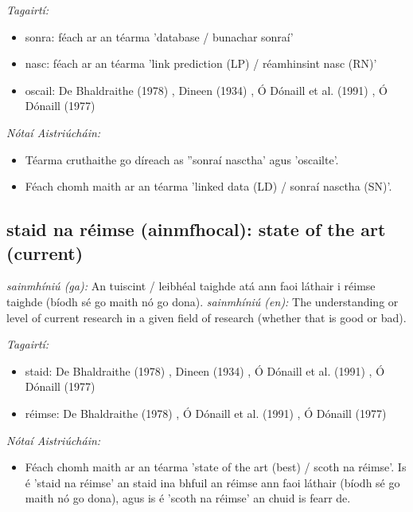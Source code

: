 \documentclass{article}
\begin{document}
 \noindent \textit{Tagairtí:}
\begin{itemize}
	\item sonra: féach ar an téarma 'database / bunachar sonraí'
	\item nasc: féach ar an téarma 'link prediction (LP) / réamhinsint nasc (RN)'
	\item oscail: De Bhaldraithe (1978) \cite{de-bhaldraithe}, Dineen (1934) \cite{dineen}, Ó Dónaill et al. (1991) \cite{focloir-beag}, Ó Dónaill (1977) \cite{odonaill}
\end{itemize}

 \noindent \textit{Nótaí Aistriúcháin:}
\begin{itemize}
	\item Téarma cruthaithe go díreach as ''sonraí nasctha' agus 'oscailte'.
	\item Féach chomh maith ar an téarma 'linked data (LD) / sonraí nasctha (SN)'.
\end{itemize}


\subsection*{staid na réimse (ainmfhocal): state of the art (current)} 
 \noindent \textit{sainmhíniú (ga):} An tuiscint / leibhéal taighde atá ann faoi láthair i réimse taighde (bíodh sé go maith nó go dona).
\newline\newline
 \noindent \textit{sainmhíniú (en):} The understanding or level of current research in a given field of research (whether that is good or bad).
\newline

 \noindent \textit{Tagairtí:}
\begin{itemize}
	\item staid: De Bhaldraithe (1978) \cite{de-bhaldraithe}, Dineen (1934) \cite{dineen}, Ó Dónaill et al. (1991) \cite{focloir-beag}, Ó Dónaill (1977) \cite{odonaill}
	\item réimse: De Bhaldraithe (1978) \cite{de-bhaldraithe}, Ó Dónaill et al. (1991) \cite{focloir-beag}, Ó Dónaill (1977) \cite{odonaill}
\end{itemize}

 \noindent \textit{Nótaí Aistriúcháin:}
\begin{itemize}
	\item Féach chomh maith ar an téarma 'state of the art (best) / scoth na réimse'. Is é 'staid na réimse' an staid ina bhfuil an réimse ann faoi láthair (bíodh sé go maith nó go dona), agus is é 'scoth na réimse' an chuid is fearr de.
\end{itemize}
\end{document}
